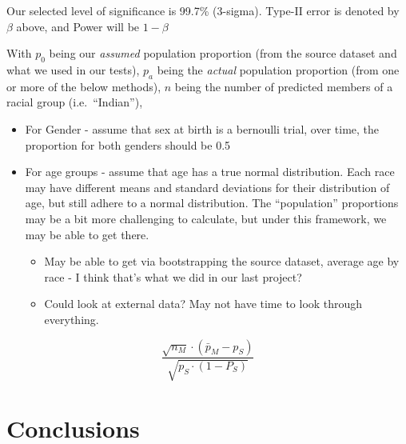 \documentclass[
  letterpaper,
  DIV=11,
  numbers=noendperiod]{scrreprt}
\begin{document}
Our selected level of significance is 99.7\% (3-sigma). Type-II error is
denoted by \(\beta\) above, and Power will be \(1-\beta\)

With \(p_0\) being our \emph{assumed} population proportion (from the
source dataset and what we used in our tests), \(p_a\) being the
\emph{actual} population proportion (from one or more of the below
methods), \(n\) being the number of predicted members of a racial group
(i.e.~``Indian''),

\begin{itemize}
\item
  For Gender - assume that sex at birth is a bernoulli trial, over time,
  the proportion for both genders should be 0.5
\item
  For age groups - assume that age has a true normal distribution. Each
  race may have different means and standard deviations for their
  distribution of age, but still adhere to a normal distribution. The
  ``population'' proportions may be a bit more challenging to calculate,
  but under this framework, we may be able to get there.

  \begin{itemize}
  \item
    May be able to get via bootstrapping the source dataset, average age
    by race - I think that's what we did in our last project?
  \item
    Could look at external data? May not have time to look through
    everything.
  \end{itemize}
\end{itemize}

\[
\frac{\sqrt{n_M}\cdot(\bar{p}_M-p_S)}{\sqrt{p_S\cdot(1-P_S)}}
\]


\hypertarget{conclusions}{%
\chapter{Conclusions}\label{conclusions}}
\end{document}
